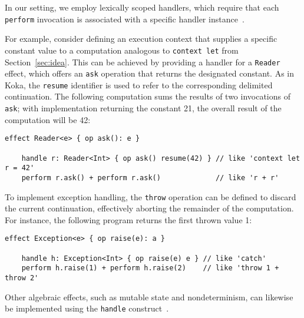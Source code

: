 \documentclass[acmsmall,review,screen]{acmart}
\newcommand{\ap}{~}
\newcommand{\keyword}[1]{\mathbf{#1}}
\begin{document}
In our setting, we employ lexically scoped handlers, which require that each \lstinline[language=colang]{perform} invocation is associated with a specific handler instance~\cite{biernacki2019binders, brachthauser2020effects}.

For example, consider defining an execution context that supplies a specific constant value to a computation analogous to \lstinline[language=colang]{context let} from Section~\ref{sec:idea}.
This can be achieved by providing a handler for a \lstinline[language=colang]{Reader} effect, which offers an \lstinline[language=colang]{ask} operation that returns the designated constant.
As in Koka, the \lstinline[language=colang]{resume} identifier is used to refer to the corresponding delimited continuation.
The following computation sums the results of two invocations of \lstinline[language=colang]{ask}; with implementation returning the constant 21, the overall result of the computation will be 42:
\begin{lstlisting}[language=colang]
    effect Reader<e> { op ask(): e }

    handle r: Reader<Int> { op ask() resume(42) } // like 'context let r = 42'
    perform r.ask() + perform r.ask()             // like 'r + r'
\end{lstlisting}

To implement exception handling, the \texttt{throw} operation can be defined to discard the current continuation, effectively aborting the remainder of the computation.
For instance, the following program returns the first thrown value 1:
\begin{lstlisting}[language=colang]
    effect Exception<e> { op raise(e): a }

    handle h: Exception<Int> { op raise(e) e } // like 'catch'
    perform h.raise(1) + perform h.raise(2)    // like 'throw 1 + throw 2'
\end{lstlisting}

Other algebraic effects, such as mutable state and nondeterminism, can likewise be implemented using the \texttt{handle} construct~\cite{plotkin2013handling}.

\end{document}
